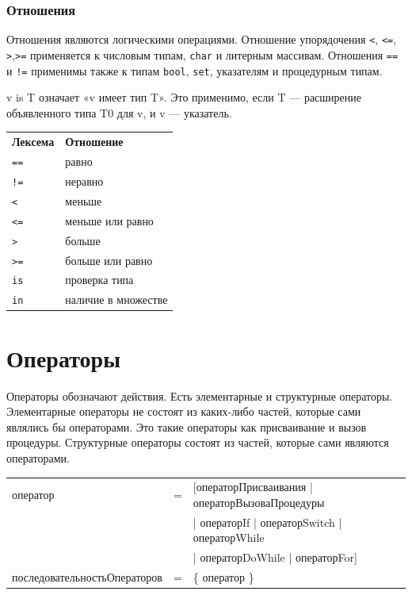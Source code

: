 \documentclass[a4paper,12pt]{article}
\begin{document}
    \subsubsection*{Отношения}

    Отношения являются логическими операциями. Отношение упорядочения \texttt{<}, \texttt{<=}, \texttt{>},\texttt{>=} применяется к числовым типам, \texttt{char} и литерным массивам. Отношения \texttt{==} и \texttt{!=} применимы также к типам \texttt{bool}, \texttt{set}, указателям и процедурным типам.

    v is T означает «v имеет тип T». Это применимо, если T — расширение объявленного типа T0 для v, и v — указатель.\\

    \begin{tabular}{ll}
        \textbf{Лексема} & \textbf{Отношение} \\
        \texttt{==} & равно \\
        \texttt{!=} & неравно \\
        \texttt{<} & меньше \\
        \texttt{<=} & меньше или равно \\
        \texttt{>} & больше \\
        \texttt{>=} & больше или равно \\
        \texttt{is} & проверка типа \\
        \texttt{in} & наличие в множестве \\
    \end{tabular}


    \section{Операторы}

    Операторы обозначают действия. Есть элементарные и структурные операторы. Элементарные операторы не состоят из каких-либо частей, которые сами являлись бы операторами. Это такие операторы как присваивание и вызов процедуры. Структурные операторы состоят из частей, которые сами являются операторами.

    \begin{center}
        \begin{tabular}{l c l}
            оператор & = & [операторПрисваивания | операторВызоваПроцедуры \\
            & & | операторIf | операторSwitch | операторWhile \\
            & & | операторDoWhile | операторFor] \\
            последовательностьОператоров & = & \{ оператор \}
        \end{tabular}
    \end{center}
\end{document}
